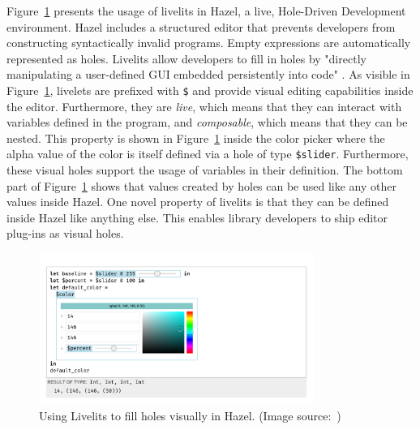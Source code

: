 Figure~\ref{fig:hazel-livelits} presents the usage of livelits in Hazel, a live, Hole-Driven Development environment.
Hazel includes a structured editor that prevents developers from constructing syntactically invalid programs.
Empty expressions are automatically represented as holes.
Livelits allow developers to fill in holes by "directly manipulating a user-defined GUI embedded persistently into code" \cite{omar_filling_2021}.
As visible in Figure~\ref{fig:hazel-livelits}, livelets are prefixed with \verb|$| and provide visual editing capabilities inside the editor.
Furthermore, they are \emph{live}, which means that they can interact with variables defined in the program, and \emph{composable}, which means that they can be nested.
This property is shown in Figure~\ref{fig:hazel-livelits} inside the color picker where the alpha value of the color is itself defined via a hole of type \verb|$slider|.
Furthermore, these visual holes support the usage of variables in their definition.
The bottom part of Figure~\ref{fig:hazel-livelits} shows that values created by holes can be used like any other values inside Hazel.
One novel property of livelits is that they can be defined inside Hazel like anything else.
This enables library developers to ship editor plug-ins as visual holes. 

\begin{figure}
    \centering
    \includegraphics[width=0.8\textwidth]{images/hazel}
    \caption{Using Livelits to fill holes visually in Hazel. (Image source:~\cite{omar_filling_2021})}
    \label{fig:hazel-livelits}
\end{figure}


